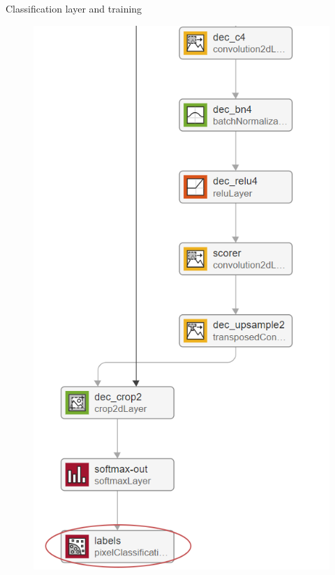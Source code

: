 \documentclass[aspectratio=169,xcolor=dvipsnames]{beamer}
\begin{document}
\begin{frame}[fragile]{Classification layer and training}
\begin{figure}
\begin{minipage}{0.3\linewidth}
\includegraphics[width=0.95\linewidth]{lastlayers.png}
\end{minipage}
	
\end{figure}
\end{frame}
\end{document}
